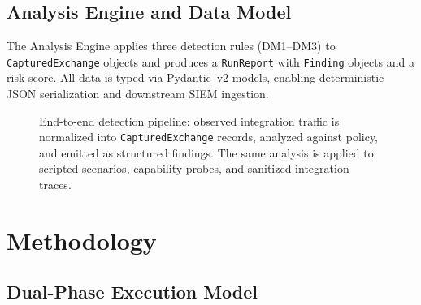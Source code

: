 \documentclass[conference]{IEEEtran}
\begin{document}
\subsection{Analysis Engine and Data Model}

The Analysis Engine applies three detection rules (DM1--DM3) to
\texttt{CapturedExchange} objects and produces a \texttt{RunReport}
with \texttt{Finding} objects and a risk score. All data is typed via
Pydantic~v2 models, enabling deterministic JSON serialization and
downstream SIEM ingestion.

\begin{figure}[htbp]
  \centering
  \caption{End-to-end detection pipeline: observed integration traffic is
  normalized into \texttt{CapturedExchange} records, analyzed against
  policy, and emitted as structured findings. The same analysis is applied
  to scripted scenarios, capability probes, and sanitized integration
  traces.}
  \label{fig:pipeline}
\end{figure}

\section{Methodology}
\label{sec:method}

\subsection{Dual-Phase Execution Model}
\end{document}
